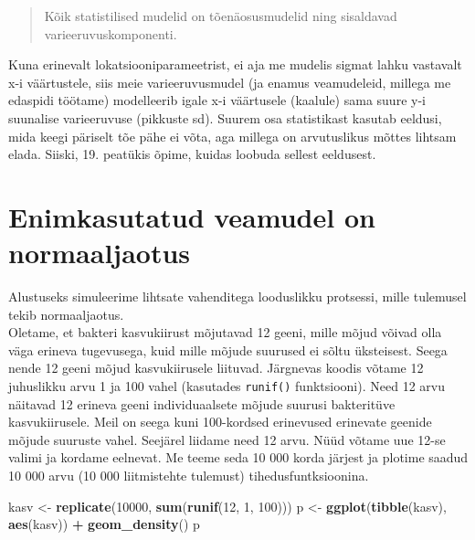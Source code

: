 \documentclass[]{book}
\newenvironment{Shaded}{\begin{snugshade}}{\end{snugshade}}
\newcommand{\KeywordTok}[1]{\textcolor[rgb]{0.13,0.29,0.53}{\textbf{#1}}}
\newcommand{\DecValTok}[1]{\textcolor[rgb]{0.00,0.00,0.81}{#1}}
\newcommand{\StringTok}[1]{\textcolor[rgb]{0.31,0.60,0.02}{#1}}
\newcommand{\OperatorTok}[1]{\textcolor[rgb]{0.81,0.36,0.00}{\textbf{#1}}}
\newcommand{\NormalTok}[1]{#1}
\begin{document}
\begin{quote}
Kõik statistilised mudelid on tõenäosusmudelid ning sisaldavad
varieeruvuskomponenti.
\end{quote}

Kuna erinevalt lokatsiooniparameetrist, ei aja me mudelis sigmat lahku
vastavalt x-i väärtustele, siis meie varieeruvusmudel (ja enamus
veamudeleid, millega me edaspidi töötame) modelleerib igale x-i
väärtusele (kaalule) sama suure y-i suunalise varieeruvuse (pikkuste
sd). Suurem osa statistikast kasutab eeldusi, mida keegi päriselt tõe
pähe ei võta, aga millega on arvutuslikus mõttes lihtsam elada. Siiski,
19. peatükis õpime, kuidas loobuda sellest eeldusest.

\section*{Enimkasutatud veamudel on
normaaljaotus}\label{enimkasutatud-veamudel-on-normaaljaotus}

Alustuseks simuleerime lihtsate vahenditega looduslikku protsessi, mille
tulemusel tekib normaaljaotus.\\
Oletame, et bakteri kasvukiirust mõjutavad 12 geeni, mille mõjud võivad
olla väga erineva tugevusega, kuid mille mõjude suurused ei sõltu
üksteisest. Seega nende 12 geeni mõjud kasvukiirusele liituvad.
Järgnevas koodis võtame 12 juhuslikku arvu 1 ja 100 vahel (kasutades
\texttt{runif()} funktsiooni). Need 12 arvu näitavad 12 erineva geeni
individuaalsete mõjude suurusi bakteritüve kasvukiirusele. Meil on seega
kuni 100-kordsed erinevused erinevate geenide mõjude suuruste vahel.
Seejärel liidame need 12 arvu. Nüüd võtame uue 12-se valimi ja kordame
eelnevat. Me teeme seda 10 000 korda järjest ja plotime saadud 10 000
arvu (10 000 liitmistehte tulemust) tihedusfuntksioonina.




\begin{Shaded}
\begin{Highlighting}[]
\NormalTok{kasv <-}\StringTok{ }\KeywordTok{replicate}\NormalTok{(}\DecValTok{10000}\NormalTok{, }\KeywordTok{sum}\NormalTok{(}\KeywordTok{runif}\NormalTok{(}\DecValTok{12}\NormalTok{, }\DecValTok{1}\NormalTok{, }\DecValTok{100}\NormalTok{))) }
\NormalTok{p <-}\StringTok{ }\KeywordTok{ggplot}\NormalTok{(}\KeywordTok{tibble}\NormalTok{(kasv), }\KeywordTok{aes}\NormalTok{(kasv)) }\OperatorTok{+}\StringTok{ }\KeywordTok{geom_density}\NormalTok{()}
\NormalTok{p}
\end{Highlighting}
\end{Shaded}
\end{document}
